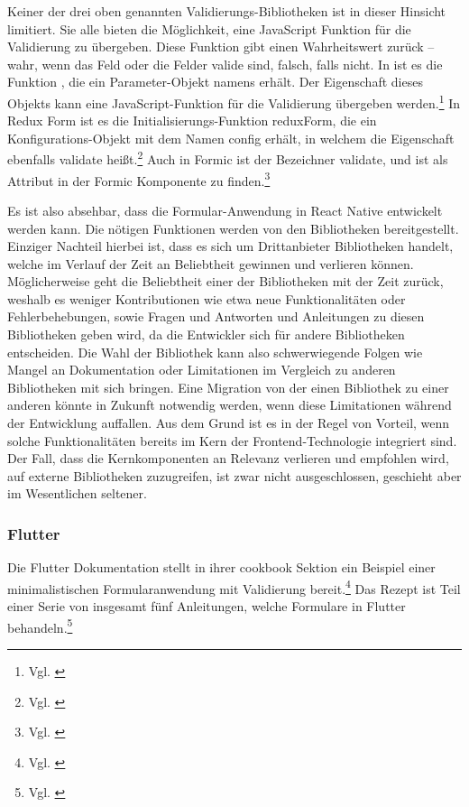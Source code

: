 Keiner der drei oben genannten Validierungs-Bibliotheken ist in dieser Hinsicht limitiert.
Sie alle bieten die Möglichkeit, eine JavaScript Funktion für die Validierung zu übergeben.
Diese Funktion gibt einen Wahrheitswert zurück – wahr, wenn das Feld oder die Felder valide sind, falsch, falls nicht.
In  ist es die Funktion , die ein Parameter-Objekt namens  erhält. Der Eigenschaft  dieses Objekts kann eine JavaScript-Funktion für die Validierung übergeben werden.\footnote{Vgl. \cite{RegisterReactHookFormAPI}}
In Redux Form ist es die Initialisierungs-Funktion reduxForm, die ein Konfigurations-Objekt mit dem Namen config erhält, in welchem die Eigenschaft ebenfalls validate heißt.\footnote{Vgl. \cite{ReduxFormReduxFormAPI}}
Auch in Formic ist der Bezeichner validate, und ist als Attribut in der Formic Komponente  zu finden.\footnote{Vgl. \cite{FormikComponentFormikDocsAPI}}


Es ist also absehbar, dass die Formular-Anwendung in React Native entwickelt werden kann.
Die nötigen Funktionen werden von den Bibliotheken bereitgestellt.
Einziger Nachteil hierbei ist, dass es sich um Drittanbieter Bibliotheken handelt, welche im Verlauf der Zeit an Beliebtheit gewinnen und verlieren können.
Möglicherweise geht die Beliebtheit einer der Bibliotheken mit der Zeit zurück, weshalb es weniger Kontributionen wie etwa neue Funktionalitäten oder Fehlerbehebungen, sowie Fragen und Antworten und Anleitungen zu diesen Bibliotheken geben wird, da die Entwickler sich für andere Bibliotheken entscheiden.
Die Wahl der Bibliothek kann also schwerwiegende Folgen wie Mangel an Dokumentation oder Limitationen im Vergleich zu anderen Bibliotheken mit sich bringen.
Eine Migration von der einen Bibliothek zu einer anderen könnte in Zukunft notwendig werden, wenn diese Limitationen während der Entwicklung auffallen.
Aus dem Grund ist es in der Regel von Vorteil, wenn solche Funktionalitäten bereits im Kern der Frontend-Technologie integriert sind.
Der Fall, dass die Kernkomponenten an Relevanz verlieren und empfohlen wird, auf externe Bibliotheken zuzugreifen, ist zwar nicht ausgeschlossen, geschieht aber im Wesentlichen seltener.


\subsubsection{Flutter}
Die Flutter Dokumentation stellt in ihrer cookbook Sektion ein Beispiel einer minimalistischen Formularanwendung mit Validierung bereit.\footnote{Vgl. \cite{BuildAFormWithValidation}} Das Rezept ist Teil einer Serie von insgesamt fünf Anleitungen, welche Formulare in Flutter behandeln.\footnote{Vgl. \cite{FormsFlutter}}

